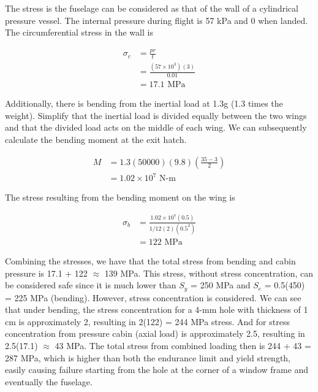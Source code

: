 \documentclass[
10pt,
a4paper,
openany,
svgnames,
]{book}
\begin{document}
\begin{solution}
  The stress is the fuselage can be considered as that of the wall of a cylindrical pressure vessel. The internal pressure during flight is 57 kPa and 0 when landed. The circumferential stress in the wall is 

  \begin{align*}
    \sigma_c &= \frac{pr}{t} \\
             &= \frac{(57 \times 10^3)(3)}{0.01} \\
             &= 17.1 \text{ MPa}
  \end{align*}

  Additionally, there is bending from the inertial load at 1.3g (1.3 times the weight). Simplify that the inertial load is divided equally between the two wings and that the divided load acts on the middle of each wing. We can subsequently calculate the bending moment at the exit hatch.

  \begin{align*}
    M &= 1.3(50000)(9.8) \left( \frac{35-3}{2} \right) \\
      &= 1.02 \times 10^7 \text{ N-m}
  \end{align*}

  The stress resulting from the bending moment on the wing is 

  \begin{align*}
    \sigma_b &= \frac{1.02 \times 10^7(0.5)}{1/12(2)(0.5^3)} \\
             &= 122 \text{ MPa}
  \end{align*}

  Combining the stresses, we have that the total stress from bending and cabin pressure is 17.1 + 122 $\approx$ 139 MPa. This stress, without stress concentration, can be considered safe since it is much lower than $S_y$ = 250 MPa and $S_e$ = 0.5(450) = 225 MPa (bending). However, stress concentration is considered. We can see that under bending, the stress concentration for a 4-mm hole with thickness of 1 cm is approximately 2, resulting in 2(122) = 244 MPa stress. And for stress concentration from pressure cabin (axial load) is approximately 2.5, resulting in 2.5(17.1) $\approx$ 43 MPa. The total stress from combined loading then is 244 + 43 = 287 MPa, which is higher than both the endurance limit and yield strength, easily causing failure starting from the hole at the corner of a window frame and eventually the fuselage.
\end{solution}
\end{document}
